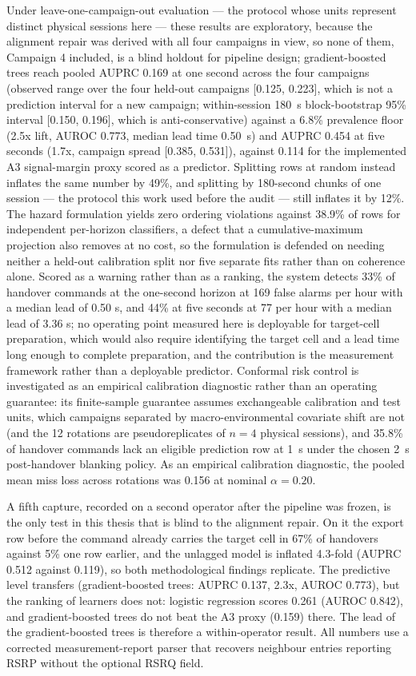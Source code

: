 Under leave-one-campaign-out evaluation --- the protocol whose units represent distinct physical sessions here --- these results are exploratory, because the alignment repair was derived with all four campaigns in view, so none of them, Campaign 4 included, is a blind holdout for pipeline design; gradient-boosted trees reach pooled AUPRC 0.169 at one second across the four campaigns (observed range over the four held-out campaigns [0.125, 0.223], which is not a prediction interval for a new campaign; within-session 180~s block-bootstrap 95\% interval [0.150, 0.196], which is anti-conservative) against a 6.8\% prevalence floor (2.5x lift, AUROC 0.773, median lead time 0.50~s) and AUPRC 0.454 at five seconds (1.7x, campaign spread [0.385, 0.531]), against 0.114 for the implemented A3 signal-margin proxy scored as a predictor. Splitting rows at random instead inflates the same number by 49\%, and splitting by 180-second chunks of one session --- the protocol this work used before the audit --- still inflates it by 12\%. The hazard formulation yields zero ordering violations against 38.9\% of rows for independent per-horizon classifiers, a defect that a cumulative-maximum projection also removes at no cost, so the formulation is defended on needing neither a held-out calibration split nor five separate fits rather than on coherence alone. Scored as a warning rather than as a ranking, the system detects 33\% of handover commands at the one-second horizon at 169 false alarms per hour with a median lead of 0.50 s, and 44\% at five seconds at 77 per hour with a median lead of 3.36 s; no operating point measured here is deployable for target-cell preparation, which would also require identifying the target cell and a lead time long enough to complete preparation, and the contribution is the measurement framework rather than a deployable predictor. Conformal risk control is investigated as an empirical calibration diagnostic rather than an operating guarantee: its finite-sample guarantee assumes exchangeable calibration and test units, which campaigns separated by macro-environmental covariate shift are not (and the 12 rotations are pseudoreplicates of $n=4$ physical sessions), and 35.8\% of handover commands lack an eligible prediction row at 1~s under the chosen 2~s post-handover blanking policy. As an empirical calibration diagnostic, the pooled mean miss loss across rotations was 0.156 at nominal $\alpha=0.20$.

A fifth capture, recorded on a second operator after the pipeline was frozen, is the only test in this thesis that is blind to the alignment repair. On it the export row before the command already carries the target cell in 67\% of handovers against 5\% one row earlier, and the unlagged model is inflated 4.3-fold (AUPRC 0.512 against 0.119), so both methodological findings replicate. The predictive level transfers (gradient-boosted trees: AUPRC 0.137, 2.3x, AUROC 0.773), but the ranking of learners does not: logistic regression scores 0.261 (AUROC 0.842), and gradient-boosted trees do not beat the A3 proxy (0.159) there. The lead of the gradient-boosted trees is therefore a within-operator result. All numbers use a corrected measurement-report parser that recovers neighbour entries reporting RSRP without the optional RSRQ field.

